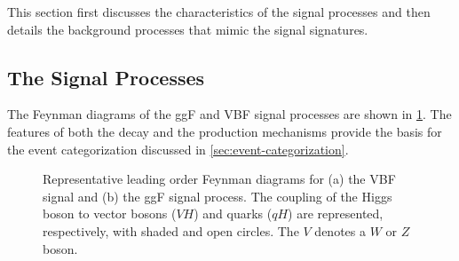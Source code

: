 This section first discusses the characteristics of the signal processes and then details the background processes that mimic the signal signatures.

\subsection{The Signal Processes}
\label{subsec:signal-bkg-characterisation}
The Feynman diagrams of the ggF and VBF signal processes are shown in \cref{fig:feyn:sig-wwprod}.
The features of both the \HWWdet decay and the production mechanisms provide the basis for the event categorization discussed in \cref{sec:event-categorization}. 

\begin{figure}[t]
    \caption{Representative leading order Feynman diagrams for (a) the VBF signal and (b) the ggF signal process. The coupling of the Higgs boson to vector bosons ($VH$) and quarks ($qH$) are represented, respectively, with shaded and open circles. The $V$ denotes a $W$ or $Z$ boson.} 
    \label{fig:feyn:sig-wwprod}
\end{figure}


